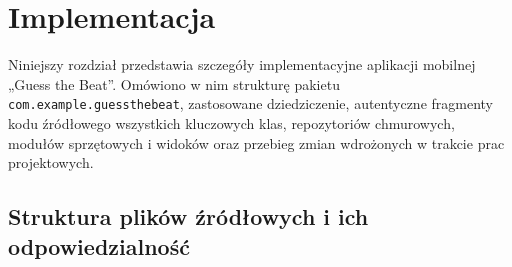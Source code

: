 \section{Implementacja}		%

\hspace{0.60cm}Niniejszy rozdział przedstawia szczegóły implementacyjne aplikacji mobilnej „Guess the Beat”. Omówiono w nim strukturę pakietu \texttt{com.example.guessthebeat}, zastosowane dziedziczenie, autentyczne fragmenty kodu źródłowego wszystkich kluczowych klas, repozytoriów chmurowych, modułów sprzętowych i widoków oraz przebieg zmian wdrożonych w trakcie prac projektowych.

\subsection{Struktura plików źródłowych i ich odpowiedzialność}


